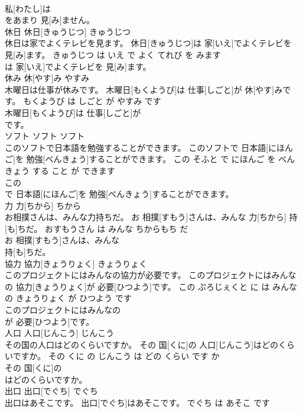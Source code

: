 \documentclass[8pt]{extreport}
\begin{document}
\begin{CJK}{UTF8}{min}
\\	私[わたし]は
\\	をあまり 見[み]ません。			
\\	休日	休日[きゅうじつ]	きゅうじつ	
\\	休日は家でよくテレビを見ます。	休日[きゅうじつ]は 家[いえ]でよくテレビを 見[み]ます。	きゅうじつ は いえ で よく てれび を みます	
\\	は 家[いえ]でよくテレビを 見[み]ます。			
\\	休み	休[やす]み	やすみ	
\\	木曜日は仕事が休みです。	木曜日[もくようび]は 仕事[しごと]が 休[やす]みです。	もくようび は しごと が やすみ です	
\\	木曜日[もくようび]は 仕事[しごと]が
\\	です。			
\\	ソフト	ソフト	ソフト	
\\	このソフトで日本語を勉強することができます。	このソフトで 日本語[にほんご]を 勉強[べんきょう]することができます。	この そふと で にほんご を べんきょう する こと が できます	
\\	この
\\	で 日本語[にほんご]を 勉強[べんきょう]することができます。			
\\	力	力[ちから]	ちから	
\\	お相撲さんは、みんな力持ちだ。	お 相撲[すもう]さんは、みんな 力[ちから] 持[も]ちだ。	おすもうさん は みんな ちからもち だ	
\\	お 相撲[すもう]さんは、みんな
\\	持[も]ちだ。			
\\	協力	協力[きょうりょく]	きょうりょく	
\\	このプロジェクトにはみんなの協力が必要です。	このプロジェクトにはみんなの 協力[きょうりょく]が 必要[ひつよう]です。	この ぷろじぇくと に は みんな の きょうりょく が ひつよう です	
\\	このプロジェクトにはみんなの
\\	が 必要[ひつよう]です。			
\\	人口	人口[じんこう]	じんこう	
\\	その国の人口はどのくらいですか。	その 国[くに]の 人口[じんこう]はどのくらいですか。	その くに の じんこう は どの くらい です か	
\\	その 国[くに]の
\\	はどのくらいですか。			
\\	出口	出口[でぐち]	でぐち	
\\	出口はあそこです。	出口[でぐち]はあそこです。	でぐち は あそこ です	

\end{CJK}
\end{document}
